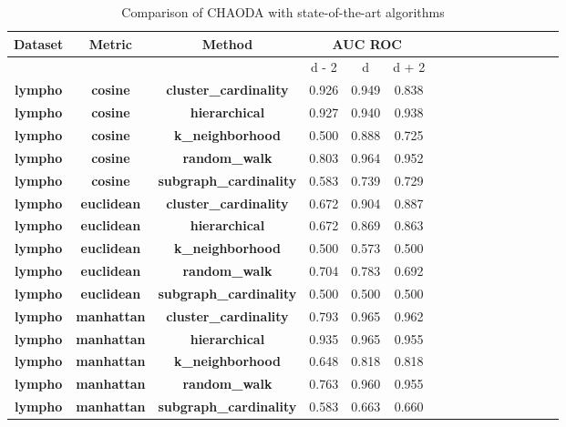 \begin{table}[!t]
\renewcommand{\arraystretch}{1.3}
\caption{Comparison of CHAODA with state-of-the-art algorithms}
\label{results:table}
\centering
\begin{tabular}{|c|c|c|c|c|c|c|c|c|c|c|c|c|c|c|c|}
\hline
{\textbf{Dataset}} & {\textbf{Metric}} & {\textbf{Method}} & \multicolumn{3}{c|}{\textbf{AUC ROC}} & \multicolumn{10}{c|}{\textbf{ }} \\
\hline
 &  &  & d - 2 & d & d + 2 &  &  &  &  &  &  &  &  &  & \\
\hline
\bfseries lympho & \bfseries cosine & \bfseries cluster\_cardinality & 0.926 & 0.949 & 0.838 &  &  &  &  &  &  &  &  &  & \\ 
\hline
\bfseries lympho & \bfseries cosine & \bfseries hierarchical & 0.927 & 0.940 & 0.938 &  &  &  &  &  &  &  &  &  & \\ 
\hline
\bfseries lympho & \bfseries cosine & \bfseries k\_neighborhood & 0.500 & 0.888 & 0.725 &  &  &  &  &  &  &  &  &  & \\ 
\hline
\bfseries lympho & \bfseries cosine & \bfseries random\_walk & 0.803 & 0.964 & 0.952 &  &  &  &  &  &  &  &  &  & \\ 
\hline
\bfseries lympho & \bfseries cosine & \bfseries subgraph\_cardinality & 0.583 & 0.739 & 0.729 &  &  &  &  &  &  &  &  &  & \\ 
\hline
\bfseries lympho & \bfseries euclidean & \bfseries cluster\_cardinality & 0.672 & 0.904 & 0.887 &  &  &  &  &  &  &  &  &  & \\ 
\hline
\bfseries lympho & \bfseries euclidean & \bfseries hierarchical & 0.672 & 0.869 & 0.863 &  &  &  &  &  &  &  &  &  & \\ 
\hline
\bfseries lympho & \bfseries euclidean & \bfseries k\_neighborhood & 0.500 & 0.573 & 0.500 &  &  &  &  &  &  &  &  &  & \\ 
\hline
\bfseries lympho & \bfseries euclidean & \bfseries random\_walk & 0.704 & 0.783 & 0.692 &  &  &  &  &  &  &  &  &  & \\ 
\hline
\bfseries lympho & \bfseries euclidean & \bfseries subgraph\_cardinality & 0.500 & 0.500 & 0.500 &  &  &  &  &  &  &  &  &  & \\ 
\hline
\bfseries lympho & \bfseries manhattan & \bfseries cluster\_cardinality & 0.793 & 0.965 & 0.962 &  &  &  &  &  &  &  &  &  & \\ 
\hline
\bfseries lympho & \bfseries manhattan & \bfseries hierarchical & 0.935 & 0.965 & 0.955 &  &  &  &  &  &  &  &  &  & \\ 
\hline
\bfseries lympho & \bfseries manhattan & \bfseries k\_neighborhood & 0.648 & 0.818 & 0.818 &  &  &  &  &  &  &  &  &  & \\ 
\hline
\bfseries lympho & \bfseries manhattan & \bfseries random\_walk & 0.763 & 0.960 & 0.955 &  &  &  &  &  &  &  &  &  & \\ 
\hline
\bfseries lympho & \bfseries manhattan & \bfseries subgraph\_cardinality & 0.583 & 0.663 & 0.660 &  &  &  &  &  &  &  &  &  & \\ 
\hline

\end{tabular}
\end{table}

